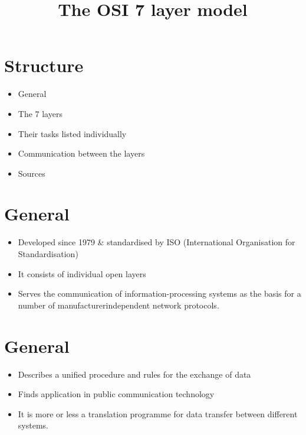 \documentclass[10pt]{article}
\title{The OSI 7 layer model }
\begin{document}
\maketitle


\section{Structure}
\begin{itemize}
  \item General

  \item The 7 layers

  \item Their tasks listed individually

  \item Communication between the layers

  \item Sources

\end{itemize}

\section{General}
\begin{itemize}
  \item Developed since 1979 \& standardised by ISO (International Organisation for Standardisation)

  \item It consists of individual open layers

  \item Serves the communication of information-processing systems as the basis for a number of manufacturerindependent network protocols.

\end{itemize}

\section{General}
\begin{itemize}
  \item Describes a unified procedure and rules for the exchange of data

  \item Finds application in public communication technology

  \item It is more or less a translation programme for data transfer between different systems.

\end{itemize}
\end{document}
